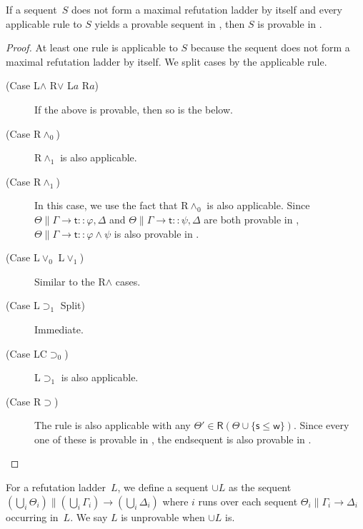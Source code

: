    \begin{proposition}\label{chooser}
    If a sequent~$S$ does not form a maximal refutation ladder by itself and
    every applicable rule to $S$ yields a provable
    sequent in \LB, then $S$ is provable in \LB.
   \end{proposition}
   \begin{proof}
    At least one rule is applicable to $S$ because the sequent does
    not form a maximal refutation ladder by itself. We split cases by the
    applicable rule.
    \begin{description}
     \item[ (Case L$\wedge$ R$\vee$ L$a$ R$a$)]
	  If the above is provable, then so is the below.
     \item[ (Case R$\wedge_0$)]
	  R$\wedge_1$ is also applicable.
     \item[ (Case R$\wedge_1$)]
	  In this case, we use the fact that R$\wedge_0$ is also
	  applicable.
	  Since $\Theta\parallel\Gamma\longrightarrow \mathsf t::\varphi, \Delta$ and
	  $\Theta\parallel\Gamma\longrightarrow \mathsf t::\psi,
	  \Delta$ are both provable in \LB,
	  $\Theta\parallel\Gamma\longrightarrow \mathsf
	  t::\varphi\land\psi$ is also provable in \LB.
     \item[ (Case L$\vee_0$ L$\vee_1$)]
	  Similar to the R$\wedge$ cases.
     \item[ (Case L$\supset_1$ Split)] Immediate.
     \item[ (Case LC$\supset_0$)]
	  L$\supset_1$ is also applicable.
     \item[ (Case R$\supset$)]
	  The rule is also applicable with any $\Theta'\in
	  \mathsf R(\Theta\cup\{\mathsf s\le \mathsf w\})$. Since every one of these is
	  provable in \LB,
	  the endsequent is also provable in \LB.
    \end{description}
   \end{proof}

   For a refutation ladder~$L$, we define a sequent $\cup L$ as
   the sequent $\left(\bigcup_i \Theta_i\right)\parallel \left(\bigcup_i \Gamma_i\right)\longrightarrow
   \left(\bigcup_i\Delta_i\right)$ where $i$ runs over
   each sequent $\Theta_i\parallel \Gamma_i\longrightarrow\Delta_i$
   occurring in~$L$.
   We say $L$ is unprovable when $\cup L$ is.

